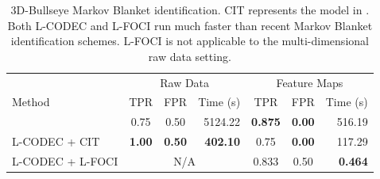\begin{table}
    \centering
    \begin{tabular}[b]{l|ccr|ccr}
        \hline\hline
        & \multicolumn{3}{c|}{Raw Data} & \multicolumn{3}{c}{Feature Maps} \\
        Method & TPR & FPR & Time (s) & TPR & FPR & Time (s) \\
        \hline
        \cite{bullseye} & 0.75 & 0.50 & 5124.22 & \textbf{0.875} & \textbf{0.00} & 516.19 \\
        L-CODEC + CIT & \textbf{1.00} & \textbf{0.50} & \textbf{402.10} & 0.75 & \textbf{0.00} & 117.29 \\
        L-CODEC + L-FOCI & \multicolumn{3}{c|}{N/A} & 0.833 & 0.50 & \textbf{0.464} \\
        \hline\hline
    \end{tabular}
    \caption[Markov blanket identification]{\label{tab:bullseye} 3D-Bullseye Markov Blanket identification. CIT represents the model in \cite{bullseye}. Both L-CODEC and L-FOCI run much faster than recent Markov Blanket identification schemes. L-FOCI is not applicable to the multi-dimensional raw data setting.}
\end{table}
